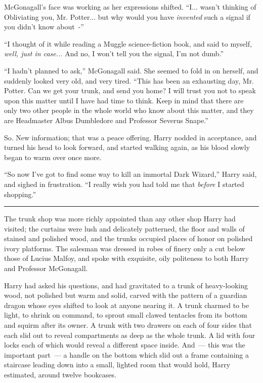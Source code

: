 McGonagall's face was working as her expressions shifted. ``I... wasn't thinking of Obliviating you, Mr. Potter... but why would you have \emph{invented} such a signal if you didn't know about~-''

``I thought of it while reading a Muggle science-fiction book, and said to myself, \emph{well, just in case...} And no, I won't tell you the signal, I'm not dumb.''

``I hadn't planned to ask,'' McGonagall said. She seemed to fold in on herself, and suddenly looked very old, and very tired. ``This has been an exhausting day, Mr. Potter. Can we get your trunk, and send you home? I will trust you not to speak upon this matter until I have had time to think. Keep in mind that there are only two other people in the whole world who know about this matter, and they are Headmaster Albus Dumbledore and Professor Severus Snape.''

So. New information; that was a peace offering. Harry nodded in acceptance, and turned his head to look forward, and started walking again, as his blood slowly began to warm over once more.

``So now I've got to find some way to kill an immortal Dark Wizard,'' Harry said, and sighed in frustration. ``I really wish you had told me that \emph{before} I started shopping.''

\begin{center}\rule{3in}{0.4pt}\end{center}

The trunk shop was more richly appointed than any other shop Harry had visited; the curtains were lush and delicately patterned, the floor and walls of stained and polished wood, and the trunks occupied places of honor on polished ivory platforms. The salesman was dressed in robes of finery only a cut below those of Lucius Malfoy, and spoke with exquisite, oily politeness to both Harry and Professor McGonagall.

Harry had asked his questions, and had gravitated to a trunk of heavy-looking wood, not polished but warm and solid, carved with the pattern of a guardian dragon whose eyes shifted to look at anyone nearing it. A trunk charmed to be light, to shrink on command, to sprout small clawed tentacles from its bottom and squirm after its owner. A trunk with two drawers on each of four sides that each slid out to reveal compartments as deep as the whole trunk. A lid with four locks each of which would reveal a different space inside. And~--- this was the important part~--- a handle on the bottom which slid out a frame containing a staircase leading down into a small, lighted room that would hold, Harry estimated, around twelve bookcases.


